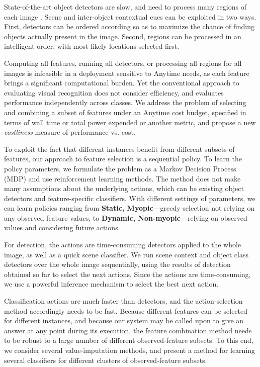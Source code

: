 State-of-the-art object detectors are slow, and need to process many regions of each image \parencite{Felzenszwalb2010a,Girshick-CVPR-2014}.
Scene and inter-object contextual cues can be exploited in two ways.
First, detectors can be ordered according so as to maximize the chance of finding objects actually present in the image.
Second, regions can be processed in an intelligent order, with most likely locations selected first.

Computing all features, running all detectors, or processing all regions for all images is infeasible in a deployment sensitive to Anytime needs, as each feature brings a significant computational burden.
Yet the conventional approach to evaluating visual recognition does not consider efficiency, and evaluates performance independently across classes.
We address the problem of selecting and combining a subset of features under an Anytime cost budget, specified in terms of wall time or total power expended or another metric, and propose a new \emph{costliness} measure of performance vs. cost.

To exploit the fact that different instances benefit from different subsets of features, our approach to feature selection is a sequential policy.
To learn the policy parameters, we formulate the problem as a Markov Decision Process (MDP) and use reinforcement learning methods.
The method does not make many assumptions about the underlying actions, which can be existing object detectors and feature-specific classifiers.
With different settings of parameters, we can learn policies ranging from \textbf{Static, Myopic}---greedy selection not relying on any observed feature values, to \textbf{Dynamic, Non-myopic}---relying on observed values and considering future actions.

For detection, the actions are time-consuming detectors applied to the whole image, as well as a quick scene classifier.
We run scene context and object class detectors over the whole image sequentially, using the results of detection obtained so far to select the next actions.
Since the actions are time-consuming, we use a powerful inference mechanism to select the best next action.

Classification actions are much faster than detectors, and the action-selection method accordingly needs to be fast.
Because different features can be selected for different instances, and because our system may be called upon to give an answer at any point during its execution, the feature combination method needs to be robust to a large number of different observed-feature subsets.
To this end, we consider several value-imputation methods, and present a method for learning several classifiers for different clusters of observed-feature subsets.

